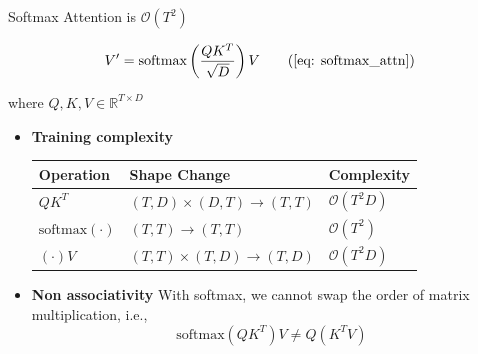 \documentclass[aspectratio=169]{beamer}
\theoremstyle{definition}
\begin{document}
\begin{frame}{Softmax Attention is $\mathcal{O}(T^2)$}

\begin{equation}
V^{\prime} = \text{softmax} \left( \frac{QK^T}{\sqrt{D}} \right) V \tag{\ref{eq: softmax_attn}}
\end{equation}


where $Q, K, V \in \mathbb{R}^{T \times D}$ 

\begin{itemize}
    
    \item \textbf{Training  complexity}
    \begin{center}
    \renewcommand{\arraystretch}{1.5}
    \begin{tabular}{lll}
    \toprule
    \textbf{Operation} & \textbf{Shape Change} & \textbf{Complexity} \\ \midrule
    $QK^T$             & $(T, D) \times (D, T) \to (T, T)$ & $\mathcal{O}(T^2 D)$ \\
    $\text{softmax}(\cdot)$ & $(T, T) \to (T, T)$               & $\mathcal{O}(T^2)$    \\
    $(\cdot)V$         & $(T, T) \times (T, D) \to (T, D)$ & $\mathcal{O}(T^2 D)$ \\ \bottomrule
    \end{tabular}
    \end{center}

    \item   \textbf{Non associativity} With softmax, we cannot swap the order of matrix multiplication, i.e., 
    \[ \text{softmax}(QK^T)V \neq Q(K^T V) \]
\end{itemize}
  

\end{frame}
\end{document}
